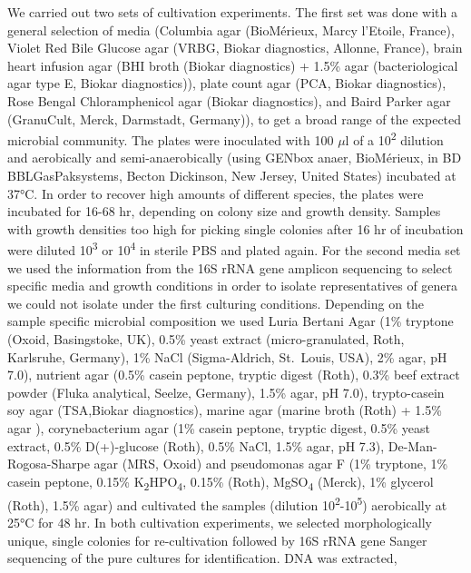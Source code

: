 \documentclass[preprint,3p,
a4paper]{elsarticle} %
\begin{document}
We carried out two sets of cultivation experiments. The first set was
done with a general selection of media (Columbia agar (BioMérieux, Marcy
l'Etoile, France), Violet Red Bile Glucose agar (VRBG, Biokar
diagnostics, Allonne, France), brain heart infusion agar (BHI broth
(Biokar diagnostics) + 1.5\% agar (bacteriological agar type E, Biokar
diagnostics)), plate count agar (PCA, Biokar diagnostics), Rose Bengal
Chloramphenicol agar (Biokar diagnostics), and Baird Parker agar
(GranuCult\texttrademark, Merck, Darmstadt, Germany)), to get a broad
range of the expected microbial community. The plates were inoculated
with 100 \(\mu\)l of a 10\textsuperscript{2} dilution and aerobically
and semi-anaerobically (using GENbox anaer, BioMérieux, in BD
BBL\texttrademark GasPak\texttrademark systems, Becton Dickinson, New
Jersey, United States) incubated at 37°C. In order to recover high
amounts of different species, the plates were incubated for 16-68 hr,
depending on colony size and growth density. Samples with growth
densities too high for picking single colonies after 16 hr of incubation
were diluted 10\textsuperscript{3} or 10\textsuperscript{4} in sterile
PBS and plated again. For the second media set we used the information
from the 16S rRNA gene amplicon sequencing to select specific media and
growth conditions in order to isolate representatives of genera we could
not isolate under the first culturing conditions. Depending on the
sample specific microbial composition we used Luria Bertani Agar (1\%
tryptone (Oxoid, Basingstoke, UK), 0.5\% yeast extract
(micro-granulated, Roth, Karlsruhe, Germany), 1\% NaCl (Sigma-Aldrich,
St.~Louis, USA), 2\% agar, pH 7.0), nutrient agar (0.5\% casein peptone,
tryptic digest (Roth), 0.3\% beef extract powder (Fluka analytical,
Seelze, Germany), 1.5\% agar, pH 7.0), trypto-casein soy agar
(TSA,Biokar diagnostics), marine agar (marine broth (Roth) + 1.5\% agar
), corynebacterium agar (1\% casein peptone, tryptic digest, 0.5\% yeast
extract, 0.5\% D(+)-glucose (Roth), 0.5\% NaCl, 1.5\% agar, pH 7.3),
De-Man-Rogosa-Sharpe agar (MRS, Oxoid) and pseudomonas agar F (1\%
tryptone, 1\% casein peptone, 0.15\%
K\textsubscript{2}HPO\textsubscript{4}, 0.15\% (Roth),
MgSO\textsubscript{4} (Merck), 1\% glycerol (Roth), 1.5\% agar) and
cultivated the samples (dilution
10\textsuperscript{2}-10\textsuperscript{5}) aerobically at 25°C for 48
hr. In both cultivation experiments, we selected morphologically unique,
single colonies for re-cultivation followed by 16S rRNA gene Sanger
sequencing of the pure cultures for identification. DNA was extracted,
\end{document}
